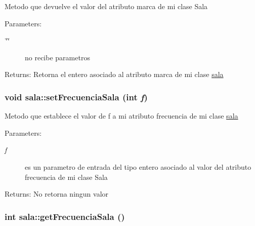 Metodo que devuelve el valor del atributo marca de mi clase Sala \begin{Desc}
\item[Parameters:]
\begin{description}
\item[{\em \char`\"{}\char`\"{}}]no recibe parametros \end{description}
\end{Desc}
\begin{Desc}
\item[Returns:]Retorna el entero asociado al atributo marca de mi clase \hyperlink{classsala}{sala} \end{Desc}
\hypertarget{classsala_ae7603393ce64c66c0d954e7ba452260}{
\subsubsection[setFrecuenciaSala]{\setlength{\rightskip}{0pt plus 5cm}void sala::setFrecuenciaSala (int {\em f})}}
\label{classsala_ae7603393ce64c66c0d954e7ba452260}


Metodo que establece el valor de f a mi atributo frecuencia de mi clase \hyperlink{classsala}{sala} \begin{Desc}
\item[Parameters:]
\begin{description}
\item[{\em f}]es un parametro de entrada del tipo entero asociado al valor del atributo frecuencia de mi clase Sala \end{description}
\end{Desc}
\begin{Desc}
\item[Returns:]No retorna ningun valor \end{Desc}
\hypertarget{classsala_24c1c2cf672362b9e82d0584cd63af97}{
\subsubsection[getFrecuenciaSala]{\setlength{\rightskip}{0pt plus 5cm}int sala::getFrecuenciaSala ()}}
\label{classsala_24c1c2cf672362b9e82d0584cd63af97}



